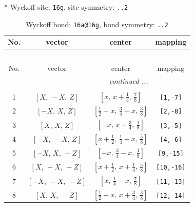 \documentclass[fleqn,8pt]{jsarticle}
\begin{document}
* Wyckoff site: {\tt 16g}, site symmetry: {\tt ..2}
\renewcommand{\arraystretch}{1.2}
\begin{longtable}{cccc}
\caption{Wyckoff bond: {\tt 16a@16g}, bond symmetry: {\tt ..2}}
 \\
 \hline \hline
No. & vector & center & mapping \\ \hline \endfirsthead

\multicolumn{3}{l}{\tablename\ \thetable{}} \\
 \hline \hline
No. & vector & center & mapping \\ \hline \endhead

 \hline \hline
\multicolumn{3}{r}{\footnotesize\it continued ...} \\ \endfoot

 \hline \hline
\multicolumn{3}{r}{} \\ \endlastfoot

1 & $\left[ X,\, - X,\, Z \right]$ & $\left[ x,\, x + \frac{1}{4},\, \frac{7}{8} \right]$ & {\tt [1,-7]} \\ \hline
2 & $\left[ - X,\, X,\, Z \right]$ & $\left[ \frac{1}{2} - x,\, \frac{3}{4} - x,\, \frac{3}{8} \right]$ & {\tt [2,-8]} \\ \hline
3 & $\left[ X,\, X,\, Z \right]$ & $\left[ - x,\, x + \frac{3}{4},\, \frac{1}{8} \right]$ & {\tt [3,-5]} \\ \hline
4 & $\left[ - X,\, - X,\, Z \right]$ & $\left[ x + \frac{1}{2},\, \frac{1}{4} - x,\, \frac{5}{8} \right]$ & {\tt [4,-6]} \\ \hline
5 & $\left[ - X,\, X,\, - Z \right]$ & $\left[ - x,\, \frac{3}{4} - x,\, \frac{1}{8} \right]$ & {\tt [9,-15]} \\ \hline
6 & $\left[ X,\, - X,\, - Z \right]$ & $\left[ x + \frac{1}{2},\, x + \frac{1}{4},\, \frac{5}{8} \right]$ & {\tt [10,-16]} \\ \hline
7 & $\left[ - X,\, - X,\, - Z \right]$ & $\left[ x,\, \frac{1}{4} - x,\, \frac{7}{8} \right]$ & {\tt [11,-13]} \\ \hline
8 & $\left[ X,\, X,\, - Z \right]$ & $\left[ \frac{1}{2} - x,\, x + \frac{3}{4},\, \frac{3}{8} \right]$ & {\tt [12,-14]} \\
\end{longtable}
\renewcommand{\arraystretch}{1.2}
\end{document}
